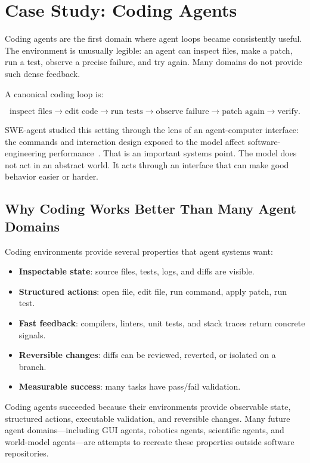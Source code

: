 \section{Case Study: Coding Agents}
\label{sec:ch21-coding-agents}

Coding agents are the first domain where agent loops became consistently useful. The environment is unusually legible: an agent can inspect files, make a patch, run a test, observe a precise failure, and try again. Many domains do not provide such dense feedback.

A canonical coding loop is:

\[
\text{inspect files} \rightarrow \text{edit code} \rightarrow \text{run tests} \rightarrow \text{observe failure} \rightarrow \text{patch again} \rightarrow \text{verify}.
\]

SWE-agent studied this setting through the lens of an agent-computer interface: the commands and interaction design exposed to the model affect software-engineering performance~\cite{yang2024sweagent}. That is an important systems point. The model does not act in an abstract world. It acts through an interface that can make good behavior easier or harder.

\subsection{Why Coding Works Better Than Many Agent Domains}

Coding environments provide several properties that agent systems want:

\begin{itemize}[nosep]
  \item \textbf{Inspectable state}: source files, tests, logs, and diffs are visible.
  \item \textbf{Structured actions}: open file, edit file, run command, apply patch, run test.
  \item \textbf{Fast feedback}: compilers, linters, unit tests, and stack traces return concrete signals.
  \item \textbf{Reversible changes}: diffs can be reviewed, reverted, or isolated on a branch.
  \item \textbf{Measurable success}: many tasks have pass/fail validation.
\end{itemize}

\begin{tcolorbox}[colback=green!4, colframe=green!45!black, title=\textbf{Why Coding Agents Matter Beyond Coding}]
Coding agents succeeded because their environments provide observable state, structured actions, executable validation, and reversible changes. Many future agent domains---including GUI agents, robotics agents, scientific agents, and world-model agents---are attempts to recreate these properties outside software repositories.
\end{tcolorbox}

